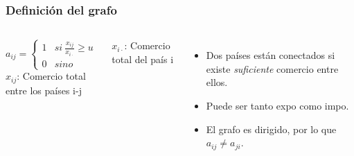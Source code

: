 \documentclass[compress]{beamer}
\begin{document}
\begin{frame}
\frametitle{Definición del grafo}

\begin{columns}[t]

$$
a_{ij} = 
\begin{cases} 
1 & si \ \frac{x_{ij}}{x_{i\cdot}}\geq u \\
0 & sino 
\end{cases}
$$
$x_{ij}$: Comercio total entre los países i-j \par
$x_{i\cdot}$: Comercio total del país i


\begin{itemize}[label=\faRebel]
\item Dos países están conectados si existe \textit{suficiente} comercio entre ellos.
\item Puede ser tanto expo como impo.
\item El grafo es dirigido, por lo que $a_{ij} \neq a_{ji}$.
\end{itemize}

\end{columns}

\end{frame}
\end{document}
